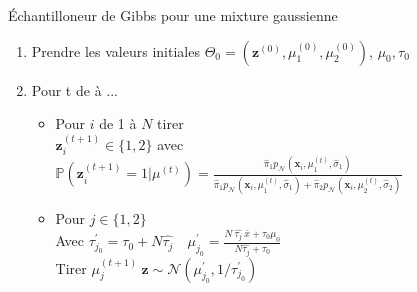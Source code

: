 \begin{frame}
    \small
    \begin{exampleblock}{\'Echantilloneur de Gibbs pour une mixture gaussienne}
    \begin{enumerate}
        \item Prendre les valeurs initiales $\Theta_0 = (\boldsymbol{z}^{(0)}, \mu_{1}^{(0)}, \mu_{2}^{(0)})$, $\mu_0, \tau_0$
        \item Pour t de  à ...
            \begin{itemize}
                \item Pour $i$ de 1 à $N$ tirer \\
                {\addtolength{\leftskip}{2cm} 
                    $\boldsymbol{z}_i^{(t+1)} \in \{1, 2 \}$ avec $\mathbb{P}(\boldsymbol{z}_i^{(t+1)}=1 | \mu^{(t)}) = 
                    { \displaystyle \frac{
                    \hat{\pi}_{1}  p_{\mathcal{N}}(\boldsymbol{x}_i,\mu_{1}^{(t)}, \hat{\sigma}_{1})
                    }{
                        \hat{\pi}_{1}  p_{\mathcal{N}}(\boldsymbol{x}_i,\mu_{1}^{(t)}, \hat{\sigma}_{1})  +  
                        \hat{\pi}_{2}  p_{\mathcal{N}}(\boldsymbol{x}_i,\mu_{2}^{(t)}, \hat{\sigma}_{2})
                    }}$
                }
                \item Pour $j \in \{ 1,2\} $ \\
                Avec 
                $\tau^{\prime}_{j_0} = \tau_0 + N \hat{\tau_j} \quad \displaystyle
                \mu_{j_0}^{\prime} = \frac{N\ \hat{\tau_j}\ \bar{x}+\tau_{0} \mu_{0}}{N \hat{\tau_j}+\tau_{0}} 
                $ \\
                Tirer $\mu_{j}^{(t+1)}\ \boldsymbol{z} \sim \mathcal{N}\left(\mu_{j_0}^{\prime}, 1 / \tau^{\prime}_{j_0}\right)$
            \end{itemize}
    \end{enumerate}
   
\end{exampleblock}
\end{frame}

